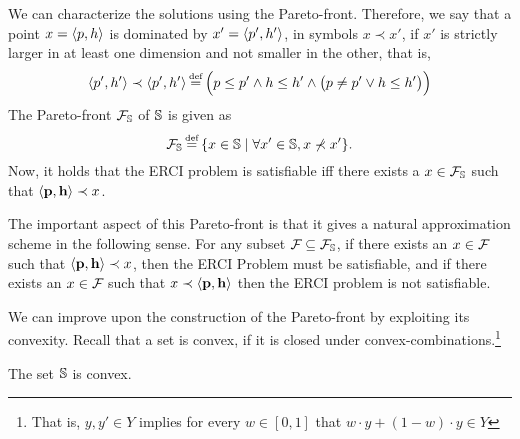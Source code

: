 \begin{example}
	
\end{example}


We can characterize the solutions using the Pareto-front. Therefore, we say that a point $x = \langle p,h \rangle$ is dominated by $x' = \langle p', h' \rangle$, in symbols $x \prec x'$, if $x'$ is strictly larger in at least one dimension and not smaller in the other, that is, 
\begin{equation}
  \langle \scp', \rndp' \rangle 	 \prec \langle \scp', \rndp' \rangle \eqdef \Big( \scp \leq \scp' \land \rndp \leq \rndp' \land \big(\scp \neq \scp' \lor \rndp \leq \rndp'\big)	\Big)
\end{equation}
The Pareto-front $\mathcal{F}_{\mathbb{S}}$ of $\mathbb{S}$ is given as \[ \pareto{\solutions} \eqdef \{ x \in \solutions \mid \forall x' \in \solutions, x \not\prec x'  \}. \]
Now, it holds that the ERCI problem is satisfiable iff there exists a  $x \in \mathcal{F}_{\mathbb{S}}$ such that $\langle \mathbf{p}, \mathbf{h} \rangle \prec x$.  

The important aspect of this Pareto-front is that it gives a natural approximation scheme in the following sense.
For any subset $\mathcal{F}_{} \subseteq \mathcal{F}_{\mathbb{S}}$, if there exists an  $x \in \mathcal{F}_{}$ such that $\langle \mathbf{p}, \mathbf{h} \rangle \prec x$, then the ERCI Problem must be satisfiable, 
and if there exists an $x \in \mathcal{F}_{}$ such that $x \prec \langle \mathbf{p}, \mathbf{h} \rangle$ then the ERCI problem is not satisfiable. 

\begin{example}
	
\end{example}

We can improve upon the construction of the Pareto-front by exploiting its convexity.
Recall that a set is convex, if it is closed under convex-combinations.\footnote{That is, $y, y' \in Y$ implies for every $w \in [0,1]$ that $w \cdot y + (1-w) \cdot y \in Y$}
\begin{proposition}
	The set $\mathbb{S}$ is convex. 
\end{proposition}


